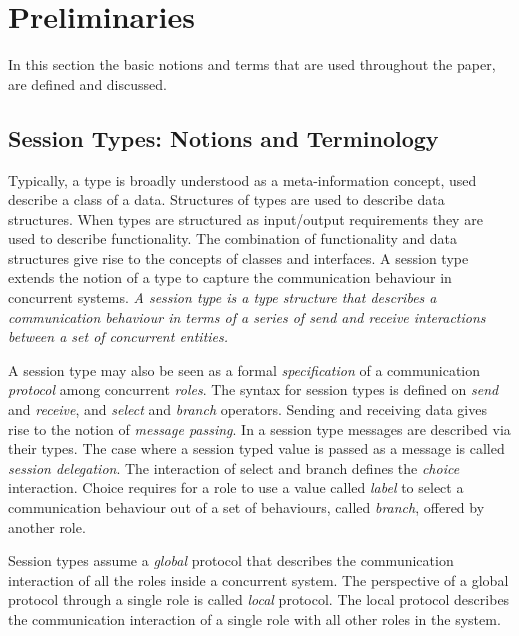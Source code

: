 \section{Preliminaries}
\label{sec:preliminaries}

In this section the basic notions and terms that are used throughout
the paper, are defined and discussed.

\subsection{Session Types: Notions and Terminology}

Typically, a type is broadly understood
as a meta-information concept, used describe a class of a data.
Structures of types are used to describe data structures.
When types are structured as input/output requirements they
are used to describe functionality.
The combination of functionality and data structures give rise
to the concepts of classes and interfaces.%
%
A session type extends %
the notion of a type to capture the communication behaviour in concurrent systems.
{\em A session type is a type structure that describes a communication
behaviour in terms of a series of send and receive %
interactions between a set of concurrent entities.}

A session type may also be seen as a
formal {\em specification} of a communication {\em protocol} among concurrent {\em roles}.
The syntax for session types is defined on {\em send} and {\em receive},
and {\em select} and {\em branch} operators.
Sending and receiving data gives rise to the notion of {\em message passing}.
In a session type messages are described via their types.
The case where a session typed value is passed as a message is called {\em session delegation}.
The interaction of select and branch defines the {\em choice} interaction.
Choice requires for a role to use a value called {\em label}
to select a communication behaviour out of a set of behaviours, called {\em branch},
offered by another role.

Session types assume a {\em global} protocol that describes the
communication interaction of all the roles inside a concurrent system.
The perspective of a global protocol through a single role
is called {\em local} protocol. The local protocol describes
the communication interaction of a single role with all other roles
in the system.

